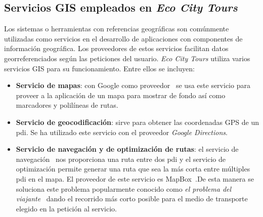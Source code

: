 	\subsection{Servicios GIS empleados en \textit{Eco City Tours}}
	Los sistemas o herramientas con referencias geográficas son comúnmente utilizadas como servicios en el desarrollo de aplicaciones con componentes de información geográfica. Los proveedores de estos servicios facilitan datos georreferenciados según las peticiones del usuario. \textit{Eco City Tours} utiliza varios servicios GIS para su funcionamiento. Entre ellos se incluyen:
	\begin{itemize}
		\item \textbf{Servicio de mapas}: con Google como proveedor~\cite{google_maps} se usa este servicio para proveer a la aplicación de un mapa para mostrar de fondo así como marcadores y polilíneas de rutas.
		
		\item \textbf{Servicio de geocodificación}: sirve para obtener las coordenadas GPS de un \acrlong{pdi}. Se ha utilizado este servicio con el proveedor \textit{Google Directions}.
		
		\item \textbf{Servicio de navegación y de optimización de rutas}: el servicio de navegación~\cite{mapbox_directions} nos proporciona una ruta entre dos \acrlong{pdi} y el servicio de optimización permite generar una ruta que sea la más corta entre múltiples \acrshort{pdi} en el mapa. El proveedor de este servicio es MapBox~\cite{mapbox_optimization}.De esta manera se soluciona este problema popularmente conocido como \textit{el problema del viajante}~\cite{ubu_algoritmia} dando el recorrido más corto posible para el medio de transporte elegido en la petición al servicio.
		
	\end{itemize}
	
